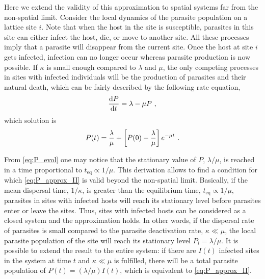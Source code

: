 Here we extend the validity of this approximation to spatial systems far
from the non-spatial limit. Consider the local dynamics of the parasite
population on a lattice site $i$. Note that when the host in the site is
susceptible, parasites in this site can either infect the host, die, or move to
another site. All these processes imply that a parasite will disappear from the
current site. Once the host at site $i$ gets infected, infection can no longer
occur whereas parasite production is now possible. If $\kappa$ is small enough
compared to $\lambda$ and $\mu$,  the only competing processes in sites with
infected individuals will be the production of parasites and their natural
death, which can be fairly described by the following rate equation,
\begin{equation}
    \frac{\mathrm{d} P}{\mathrm{d} t}=\lambda-\mu P \ ,
\end{equation}
which solution is
\begin{equation}\label{eq:P_evol}
    P(t)=\frac{\lambda}{\mu}+\left[P(0)-\frac{\lambda}{\mu}\right]e^{-\mu t}
    \ .
\end{equation}

From \cref{eq:P_evol} one may notice that the stationary value of $P$,
$\lambda/\mu$, is reached in a time proportional to $t_{\textrm{eq}}\propto
    1/\mu$. This derivation allows to find a condition for which
\cref{eq:P_approx_II}
is valid beyond the non-spatial limit. Basically, if the mean dispersal time,
$1/\kappa$, is greater than the equilibrium time, $t_{\textrm{eq}}\propto
    1/\mu$, parasites in sites with infected hosts will reach its stationary
level
before parasites enter or leave the sites. Thus, sites with infected hosts can
be considered as a closed system and the approximation holds. In other words,
if the dispersal rate of parasites is small compared to the parasite
deactivation rate, $\kappa \ll \mu$, the local parasite population of the site
will reach its stationary level $P_i=\lambda/\mu$. It is possible to extend the
result to the entire system: if there are $I(t)$ infected sites in the system
at time $t$ and $\kappa\ll\mu$ is fulfilled, there will be a total parasite
population of $P(t)=(\lambda/\mu) I(t)$, which is equivalent to
\cref{eq:P_approx_II}.

